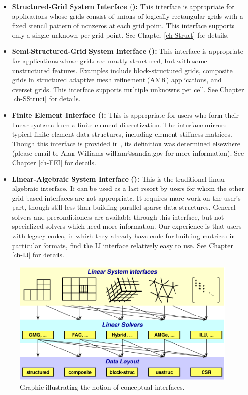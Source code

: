 \begin{itemize}

\item
{\bf Structured-Grid System Interface ():} This interface is
appropriate for applications whose grids consist of unions of logically
rectangular grids with a fixed stencil pattern of nonzeros at each grid point.
This interface supports only a single unknown per grid point.  See Chapter
\ref{ch-Struct} for details.

\item
{\bf Semi-Structured-Grid System Interface ():} This
interface is appropriate for applications whose grids are mostly
structured, but with some unstructured features.  Examples include
block-structured grids, composite grids in structured adaptive mesh
refinement (AMR) applications, and overset grids.  This interface
supports multiple unknowns per cell. See Chapter \ref{ch-SStruct} for details.

\item
{\bf Finite Element Interface ():} This is appropriate for
users who form their linear systems from a finite element
discretization.  The interface mirrors typical finite element data
structures, including element stiffness matrices.  Though this
interface is provided in \hypre{}, its definition was determined
elsewhere (please email to Alan Williams william@sandia.gov for
more information). See Chapter \ref{ch-FEI} for details.

\item
{\bf Linear-Algebraic System Interface ():} This is the
traditional linear-algebraic interface.  It can be used as a last
resort by users for whom the other grid-based interfaces are not
appropriate.  It requires more work on the user's part, though still
less than building parallel sparse data structures.  General solvers
and preconditioners are available through this interface, but not
specialized solvers which need more information.  Our experience is
that users with legacy codes, in which they already have code for
building matrices in particular formats, find the IJ interface
relatively easy to use. See Chapter \ref{ch-IJ} for details.

\end{itemize}


\begin{figure}
\centering
\includegraphics[width=5in]{fig_concep_iface}
\caption{%
Graphic illustrating the notion of conceptual interfaces.}
\label{fig-conceptual-interface}
\end{figure}

